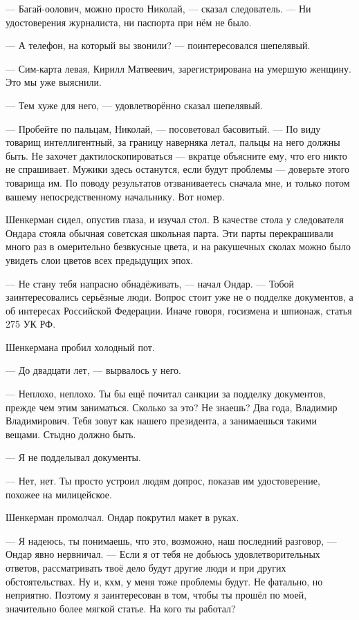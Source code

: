 --- Багай-оолович, можно просто Николай, --- сказал следователь.
--- Ни удостоверения журналиста, ни паспорта при нём не было.

--- А телефон, на который вы звонили? --- поинтересовался шепелявый.

--- Сим-карта левая, Кирилл Матвеевич, зарегистрирована на умершую женщину.
Это мы уже выяснили.

--- Тем хуже для него, --- удовлетворённо сказал шепелявый.

--- Пробейте по пальцам, Николай, --- посоветовал басовитый.
--- По виду товарищ интеллигентный, за границу наверняка летал, пальцы на него должны быть.
Не захочет дактилоскопироваться --- вкратце объясните ему, что его никто не спрашивает.
Мужики здесь останутся, если будут проблемы --- доверьте этого товарища им.
По поводу результатов отзваниваетесь сначала мне, и только потом вашему непосредственному начальнику.
Вот номер.

\asterism

Шенкерман сидел, опустив глаза, и изучал стол.
В качестве стола у следователя Ондара стояла обычная советская школьная парта.
Эти парты перекрашивали много раз в омерительно безвкусные цвета, и на ракушечных сколах можно было увидеть слои цветов всех предыдущих эпох.

--- Не стану тебя напрасно обнадёживать, --- начал Ондар.
--- Тобой заинтересовались серьёзные люди.
Вопрос стоит уже не о подделке документов, а об интересах Российской Федерации.
Иначе говоря, госизмена и шпионаж, статья 275 УК РФ.

Шенкермана пробил холодный пот.

--- До двадцати лет, --- вырвалось у него.

--- Неплохо, неплохо.
Ты бы ещё почитал санкции за подделку документов, прежде чем этим заниматься.
Сколько за это?
Не знаешь?
Два года, Владимир Владимирович.
Тебя зовут как нашего президента, а занимаешься такими вещами.
Стыдно должно быть.

--- Я не подделывал документы.

--- Нет, нет.
Ты просто устроил людям допрос, показав им удостоверение, похожее на милицейское.

Шенкерман промолчал.
Ондар покрутил макет в руках.

--- Я надеюсь, ты понимаешь, что это, возможно, наш последний разговор, --- Ондар явно нервничал.
--- Если я от тебя не добьюсь удовлетворительных ответов, рассматривать твоё дело будут другие люди и при других обстоятельствах.
Ну и, кхм, у меня тоже проблемы будут.
Не фатально, но неприятно.
Поэтому я заинтересован в том, чтобы ты прошёл по моей, значительно более мягкой статье.
На кого ты работал?

